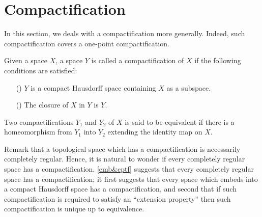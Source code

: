 \section{Compactification}

In this section, we deals with a compactification more generally.
Indeed, such compactification covers a one-point compactification.
\begin{defi}[Compactification]
    Given a space $X$, a space $Y$ is called a compactification of $X$ if the following conditions are satisfied:
    \begin{enumerate}
        \item[(\romannumeral 1)]
        {
            $Y$ is a compact Hausdorff space containing $X$ as a subspace.
        }
        \item[(\romannumeral 2)]
        {
            The closure of $X$ in $Y$ is $Y$.
        }
    \end{enumerate}
    Two compactifications $Y_1$ and $Y_2$ of $X$ is said to be equivalent if there is a homeomorphism from $Y_1$ into $Y_2$ extending the identity map on $X$.
\end{defi}
Remark that a topological space which has a compactification is necessarily completely regular.
Hence, it is natural to wonder if every completely regular space has a compactification.
\cref{emb&cptf} suggests that every completely regular space has a compactification; it first suggests that every space which embeds into a compact Hausdorff space has a compactification, and second that if such compactification is required to satisfy an ``extension property'' then such compactification is unique up to equivalence.

